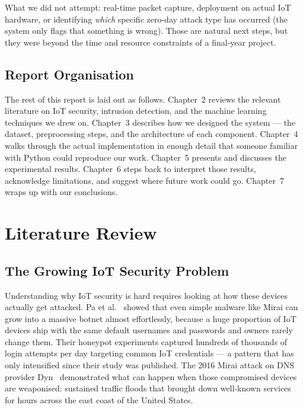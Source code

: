 \documentclass[12pt,a4paper]{report}
\begin{document}
\noindent What we did not attempt: real-time packet capture, deployment on actual
IoT hardware, or identifying \textit{which} specific zero-day attack type has occurred
(the system only flags that something is wrong). Those are natural next steps, but
they were beyond the time and resource constraints of a final-year project.

\section{Report Organisation}

The rest of this report is laid out as follows. Chapter~2 reviews the relevant
literature on IoT security, intrusion detection, and the machine learning techniques
we drew on. Chapter~3 describes how we designed the system — the dataset, preprocessing
steps, and the architecture of each component. Chapter~4 walks through the actual
implementation in enough detail that someone familiar with Python could reproduce our
work. Chapter~5 presents and discusses the experimental results. Chapter~6 steps back
to interpret those results, acknowledge limitations, and suggest where future work
could go. Chapter~7 wraps up with our conclusions.



\chapter{Literature Review}

\section{The Growing IoT Security Problem}

Understanding why IoT security is hard requires looking at how these devices
actually get attacked. Pa et al.~\cite{iot_malware} showed that even simple malware
like Mirai can grow into a massive botnet almost effortlessly, because a huge
proportion of IoT devices ship with the same default usernames and passwords and
owners rarely change them. Their honeypot experiments captured hundreds of thousands
of login attempts per day targeting common IoT credentials — a pattern that has only
intensified since their study was published. The 2016 Mirai attack on DNS provider
Dyn~\cite{mirai_attack} demonstrated what can happen when those compromised devices
are weaponised: sustained traffic floods that brought down well-known services for
hours across the east coast of the United States.
\end{document}
